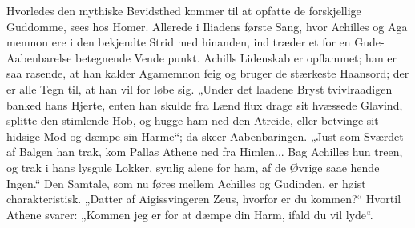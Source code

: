 \documentclass[12pt]{book}
\newcommand{\opage}[1]{\marginnote{\footnotesize\textit{[#1]}}}
\begin{document}
Hvorledes den mythiske Bevidsthed kommer til at
opfatte de forskjellige Guddomme, sees hos Homer.
Allerede i Iliadens første Sang, hvor Achilles og Aga\-%
memnon ere i den bekjendte Strid med hinanden, ind\-%
træder et for en Gude-Aabenbarelse betegnende Vende\-%
punkt. Achills Lidenskab er opflammet; han er saa
rasende, at han kalder Agamemnon feig og bruger de
stærkeste Haansord; der er alle Tegn til, at han vil for\-%
løbe sig. „Under det laadene Bryst tvivlraadigen banked
hans Hjerte, enten han skulde fra Lænd flux drage sit
hvæssede Glavind, splitte den stimlende Hob, og hugge
\opage{93}\setcounter{footnote}{0}%
ham ned den Atreide, eller betvinge sit hidsige Mod og
dæmpe sin Harme“; da skeer Aabenbaringen. „Just
som Sværdet af Balgen han trak, kom Pallas Athene
ned fra Himlen... Bag Achilles hun treen, og trak i
hans lysgule Lokker, synlig alene for ham, af de Øvrige
saae hende Ingen.“ Den Samtale, som nu føres mellem
Achilles og Gudinden, er høist charakteristisk. „Datter
af Aigissvingeren Zeus, hvorfor er du kommen?“ Hvortil
Athene svarer: „Kommen jeg er for at dæmpe din Harm,
ifald du vil lyde“.
\end{document}
